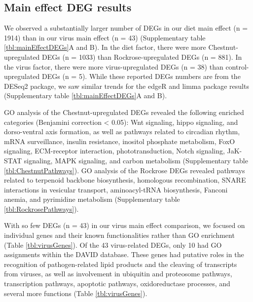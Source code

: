 \documentclass[11pt,a4paper,oldfontcommands,openany]{memoir}
\numberwithin{equation}{section} %
\begin{document}
\subsection{Main effect DEG results}

We observed a substantially larger number of DEGs in our diet main effect (n = 1914) than in our virus main effect (n = 43) (Supplementary table \ref{tbl:mainEffectDEGs}A and B). In the diet factor, there were more Chestnut-upregulated DEGs (n = 1033) than Rockrose-upregulated DEGs (n = 881). In the virus factor, there were more virus-upregulated DEGs (n = 38) than control-upregulated DEGs (n = 5). While these reported DEGs numbers are from the DESeq2 package, we saw similar trends for the edgeR and limma package results (Supplementary table \ref{tbl:mainEffectDEGs}A and B).

GO analysis of the Chestnut-upregulated DEGs revealed the following enriched categories (Benjamini correction < 0.05): Wnt signaling, hippo signaling, and dorso-ventral axis formation, as well as pathways related to circadian rhythm, mRNA surveillance, insulin resistance, inositol phosphate metabolism, FoxO signaling, ECM-receptor interaction, phototransduction, Notch signaling, JaK-STAT signaling, MAPK signaling, and carbon metabolism (Supplementary table \ref{tbl:ChestnutPathways}). GO analysis of the Rockrose DEGs revealed pathways related to terpenoid backbone biosynthesis, homologous recombination, SNARE interactions in vesicular transport, aminoacyl-tRNA biosynthesis, Fanconi anemia, and pyrimidine metabolism (Supplementary table \ref{tbl:RockrosePathways}).

With so few DEGs (n = 43) in our virus main effect comparison, we focused on individual genes and their known functionalities rather than GO enrichment (Table \ref{tbl:virusGenes}). Of the 43 virus-related DEGs, only 10 had GO assignments within the DAVID database. These genes had putative roles in the recognition of pathogen-related lipid products and the cleaving of transcripts from viruses, as well as involvement in ubiquitin and proteosome pathways, transcription pathways, apoptotic pathways, oxidoreductase processes, and several more functions (Table \ref{tbl:virusGenes}).
\end{document}
